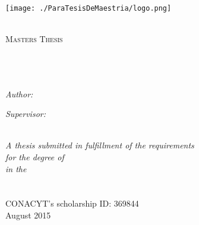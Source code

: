 \documentclass[11pt, oneside]{Thesis} %
\begin{document}
\begin{titlepage}
\begin{center}


\texttt{[image: ./ParaTesisDeMaestria/logo.png]}

\textsc{\LARGE \univname}\\[1.5cm] %



\textsc{\Large Masters Thesis}\\[0.5cm] %

\HRule \\[0.4cm] %
{\huge \bfseries \ttitle}\\[0.4cm] %
\HRule \\[1.5cm] %
 
\begin{minipage}{0.4\textwidth}
\begin{flushleft} \large
\emph{Author:}\\
\href{mail:jsalazar@gdl.cinvestav.mx}{\authornames} %
\end{flushleft}
\end{minipage}
\begin{minipage}{0.4\textwidth}
\begin{flushright} \large
\emph{Supervisor:} \\
\href{mail:amendez@gdl.cinvestav.mx}{\supname} %
\end{flushright}
\end{minipage}\\[25mm]
 
\large \textit{A thesis submitted in fulfillment of the requirements\\ 
for the degree of \degreename}\\[0.3cm] %
\textit{in the}\\[0.4cm]
\groupname\\\deptname\\[12mm] %
CONACYT's scholarship ID: 369844\\[15mm]
 
{\large August 2015}\\[4cm] %
 
\vfill
\end{center}

\end{titlepage}
\end{document}
